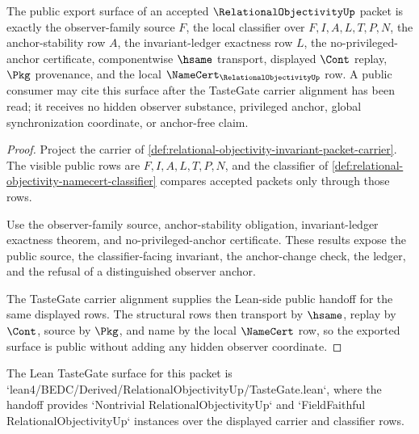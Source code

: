 \begin{theorem}
\label{thm:relational-objectivity-public-namecert-export}
The public export surface of an accepted $\RelationalObjectivityUp$ packet is exactly the observer-family source $F$, the local classifier over $F,I,A,L,T,P,N$, the anchor-stability row $A$, the invariant-ledger exactness row $L$, the no-privileged-anchor certificate, componentwise $\hsame$ transport, displayed $\Cont$ replay, $\Pkg$ provenance, and the local $\NameCert_{\RelationalObjectivityUp}$ row. A public consumer may cite this surface after the TasteGate carrier alignment has been read; it receives no hidden observer substance, privileged anchor, global synchronization coordinate, or anchor-free claim.
\end{theorem}
\begin{proof}
Project the carrier of \autoref{def:relational-objectivity-invariant-packet-carrier}. The visible public rows are $F,I,A,L,T,P,N$, and the classifier of \autoref{def:relational-objectivity-namecert-classifier} compares accepted packets only through those rows.

Use the observer-family source, anchor-stability obligation, invariant-ledger exactness theorem, and no-privileged-anchor certificate. These results expose the public source, the classifier-facing invariant, the anchor-change check, the ledger, and the refusal of a distinguished observer anchor.

The TasteGate carrier alignment supplies the Lean-side public handoff for the same displayed rows. The structural rows then transport by $\hsame$, replay by $\Cont$, source by $\Pkg$, and name by the local $\NameCert$ row, so the exported surface is public without adding any hidden observer coordinate.
\end{proof}



The Lean TasteGate surface for this packet is `lean4/BEDC/Derived/RelationalObjectivityUp/TasteGate.lean`, where the handoff provides `Nontrivial RelationalObjectivityUp` and `FieldFaithful RelationalObjectivityUp` instances over the displayed carrier and classifier rows.

